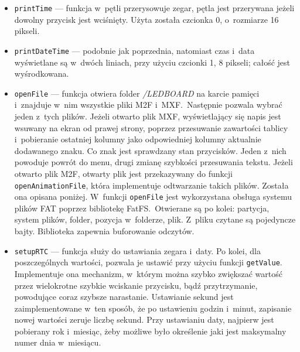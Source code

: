\begin{itemize}
	\item \texttt{printTime} --- funkcja w~pętli przerysowuje zegar, pętla jest przerywana jeżeli dowolny przycisk jest wciśnięty. Użyta została czcionka 0, o~rozmiarze 16 pikseli.
	\item \texttt{printDateTime} --- podobnie jak poprzednia, natomiast czas i~data wyświetlane są w~dwóch liniach, przy użyciu czcionki 1, 8 pikseli; całość jest wyśrodkowana.
	\item \texttt{openFile} --- funkcja otwiera folder \textit{/LEDBOARD} na karcie pamięci i~znajduje w~nim wszystkie pliki M2F i~MXF.~Następnie pozwala wybrać jeden z~tych plików. Jeżeli otwarto plik MXF, wyświetlający się napis jest wsuwany na ekran od prawej strony, poprzez przesuwanie zawartości tablicy i~pobieranie ostatniej kolumny jako odpowiedniej kolumny aktualnie dodawanego znaku. Co znak jest sprawdzany stan przycisków. Jeden z~nich powoduje powrót do menu, drugi zmianę szybkości przesuwania tekstu. Jeżeli otwarto plik M2F, otwarty plik jest przekazywany do funkcji \texttt{openAnimationFile}, która implementuje odtwarzanie takich plików. Została ona opisana poniżej. W~funkcji \texttt{openFile} jest wykorzystana obsługa systemu plików FAT poprzez bibliotekę FatFS.~Otwierane są po kolei: partycja, system plików, folder, pozycja w~folderze, plik. Z~pliku czytane są pojedyncze bajty. Biblioteka zapewnia buforowanie odczytów.
	\item \texttt{setupRTC} --- funkcja służy do ustawiania zegara i~daty. Po kolei, dla poszczególnych wartości, pozwala je ustawić przy użyciu funkcji \texttt{getValue}. Implementuje ona mechanizm, w~którym można szybko zwiększać wartość przez wielokrotne szybkie wciskanie przycisku, bądź przytrzymanie, powodujące coraz szybsze narastanie. Ustawianie sekund jest zaimplementowane w~ten sposób, że po ustawieniu godzin i~minut, zapisanie nowej wartości zeruje liczbę sekund. Przy ustawianiu daty, najpierw jest pobierany rok i~miesiąc, żeby możliwe było określenie jaki jest maksymalny numer dnia w~miesiącu.

\end{itemize}
